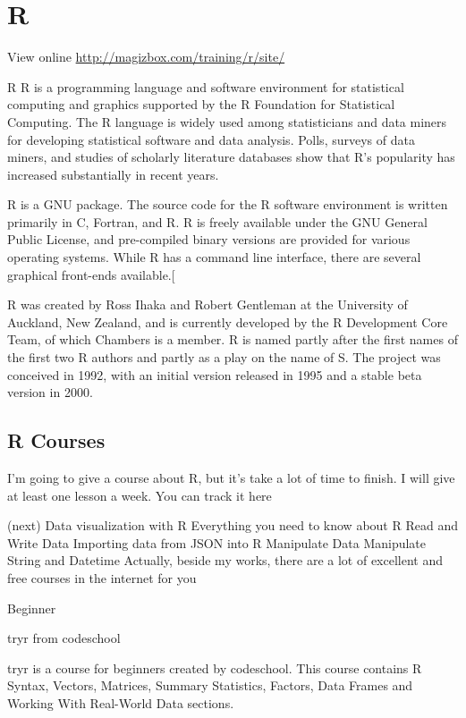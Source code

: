 \chapter{R}

View online \href{http://magizbox.com/training/r/site/}{http://magizbox.com/training/r/site/}

R
R is a programming language and software environment for statistical computing and graphics supported by the R Foundation for Statistical Computing. The R language is widely used among statisticians and data miners for developing statistical software and data analysis. Polls, surveys of data miners, and studies of scholarly literature databases show that R's popularity has increased substantially in recent years.

R is a GNU package. The source code for the R software environment is written primarily in C, Fortran, and R. R is freely available under the GNU General Public License, and pre-compiled binary versions are provided for various operating systems. While R has a command line interface, there are several graphical front-ends available.[

R was created by Ross Ihaka and Robert Gentleman at the University of Auckland, New Zealand, and is currently developed by the R Development Core Team, of which Chambers is a member. R is named partly after the first names of the first two R authors and partly as a play on the name of S. The project was conceived in 1992, with an initial version released in 1995 and a stable beta version in 2000.

\section{R Courses}

I'm going to give a course about R, but it's take a lot of time to finish. I will give at least one lesson a week. You can track it here

(next) Data visualization with R
Everything you need to know about R
Read and Write Data
Importing data from JSON into R
Manipulate Data
Manipulate String and Datetime
Actually, beside my works, there are a lot of excellent and free courses in the internet for you

Beginner

tryr from codeschool

tryr is a course for beginners created by codeschool. This course contains R Syntax, Vectors, Matrices, Summary Statistics, Factors, Data Frames and Working With Real-World Data sections.

